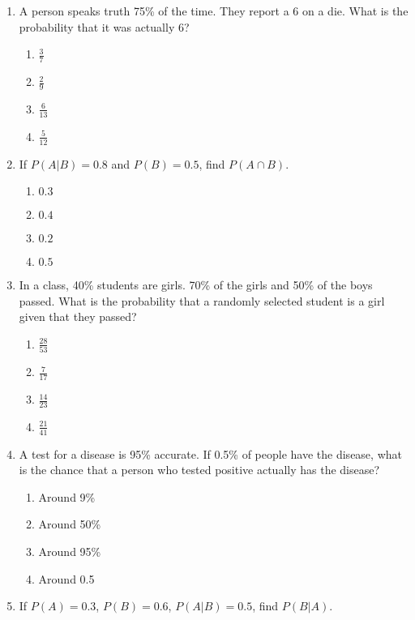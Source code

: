 \begin{enumerate}
\item A person speaks truth 75\% of the time. They report a 6 on a die. What is the probability that it was actually 6?

\begin{enumerate}[label=(\alph*)]
\item \(\frac{3}{7}\) \quad \item \(\frac{2}{9}\) \quad \item \(\frac{6}{13}\) \quad \item \(\frac{5}{12}\)
\end{enumerate}
\newpage
\item If \(P(A|B) = 0.8\) and \(P(B) = 0.5\), find \(P(A \cap B)\).

\begin{enumerate}[label=(\alph*)]
\item \(0.3\) \quad \item \(0.4\) \quad \item \(0.2\) \quad \item \(0.5\)
\end{enumerate}

\item In a class, 40\% students are girls. 70\% of the girls and 50\% of the boys passed. What is the probability that a randomly selected student is a girl given that they passed?

\begin{enumerate}[label=(\alph*)]
\item \(\frac{28}{53}\) \quad \item \(\frac{7}{17}\) \quad \item \(\frac{14}{23}\) \quad \item \(\frac{21}{41}\)
\end{enumerate}

\item A test for a disease is 95\% accurate. If 0.5\% of people have the disease, what is the chance that a person who tested positive actually has the disease?

\begin{enumerate}[label=(\alph*)]
\item Around 9\% \quad \item Around 50\% \quad \item Around 95\% \quad \item Around 0.5%
\end{enumerate}

\item If \(P(A) = 0.3\), \(P(B) = 0.6\), \(P(A|B) = 0.5\), find \(P(B|A)\).


\end{enumerate}
